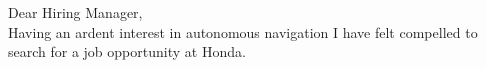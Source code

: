 Dear Hiring Manager,\\
\vspace{0.4cm}
Having an ardent interest in autonomous navigation I have felt compelled to search for a job opportunity at Honda.\\\smallskip
